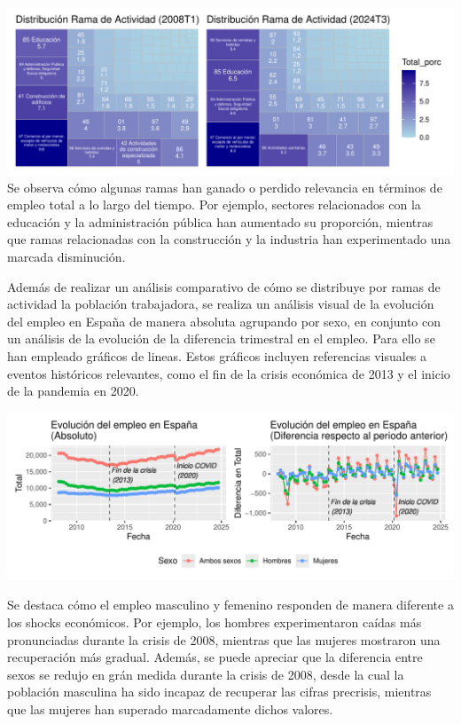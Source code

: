 \documentclass[notspecified,article,submit,moreauthors,pdftex]{Definitions/mdpi}
\begin{document}
\includegraphics{ProyectoAED2024_files/figure-latex/unnamed-chunk-38-1.pdf}
Se observa cómo algunas ramas han ganado o perdido relevancia en
términos de empleo total a lo largo del tiempo. Por ejemplo, sectores
relacionados con la educación y la administración pública han aumentado
su proporción, mientras que ramas relacionadas con la construcción y la
industria han experimentado una marcada disminución.

Además de realizar un análisis comparativo de cómo se distribuye por
ramas de actividad la población trabajadora, se realiza un análisis
visual de la evolución del empleo en España de manera absoluta agrupando
por sexo, en conjunto con un análisis de la evolución de la diferencia
trimestral en el empleo. Para ello se han empleado gráficos de lineas.
Estos gráficos incluyen referencias visuales a eventos históricos
relevantes, como el fin de la crisis económica de 2013 y el inicio de la
pandemia en 2020.

\includegraphics{ProyectoAED2024_files/figure-latex/unnamed-chunk-39-1.pdf}

Se destaca cómo el empleo masculino y femenino responden de manera
diferente a los shocks económicos. Por ejemplo, los hombres
experimentaron caídas más pronunciadas durante la crisis de 2008,
mientras que las mujeres mostraron una recuperación más gradual. Además,
se puede apreciar que la diferencia entre sexos se redujo en grán medida
durante la crisis de 2008, desde la cual la población masculina ha sido
incapaz de recuperar las cifras precrisis, mientras que las mujeres han
superado marcadamente dichos valores.
\end{document}
